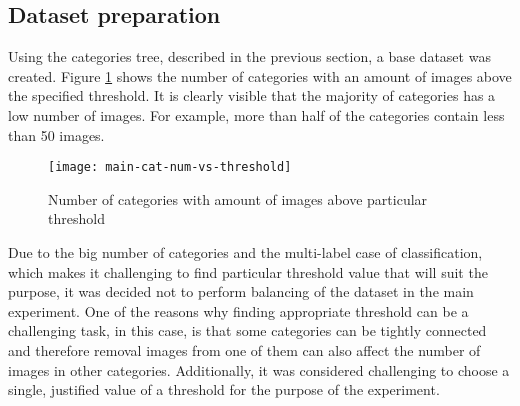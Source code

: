     
    
    
    
    
    
    
    
    
    \subsection{Dataset preparation}
    Using the categories tree, described in the previous section, a base dataset was created. Figure \ref{fig:main-cat-num-vs-threshold} shows the number of categories with an amount of images above the specified threshold. It is clearly visible that the majority of categories has a low number of images. For example, more than half of the categories contain less than 50 images.
    
    
    \begin{figure}[h!]
        \centering
        \texttt{[image: main-cat-num-vs-threshold]}
        \caption{Number of categories with amount of images above particular threshold}
        \label{fig:main-cat-num-vs-threshold}
    \end{figure}
    
    Due to the big number of categories and the multi-label case of classification, which makes it challenging to find particular threshold value that will suit the purpose, it was decided not to perform balancing of the dataset in the main experiment. One of the reasons why finding appropriate threshold can be a challenging task, in this case, is that some categories can be tightly connected and therefore removal images from one of them can also affect the number of images in other categories. Additionally, it was considered challenging to choose a single, justified value of a threshold for the purpose of the experiment.
    
